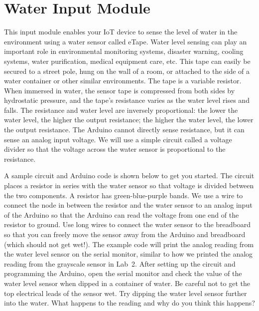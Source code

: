 
\clearpage
\section{Water Input Module}
\label{sec-input-water}

This input module enables your IoT device to sense the level of water in
the environment using a water sensor called eTape. Water level sensing
can play an important role in environmental monitoring systems, disaster
warning, cooling systems, water purification, medical equipment care,
etc. This tape can easily be secured to a street pole, hung on the wall
of a room, or attached to the side of a water container or other similar
environments. The tape is a variable resistor. When immersed in water,
the sensor tape is compressed from both sides by hydrostatic pressure,
and the tape's resistance varies as the water level rises and falls. The
resistance and water level are inversely proportional: the lower the
water level, the higher the output resistance; the higher the water
level, the lower the output resistance.  The Arduino cannot directly
sense resistance, but it can sense an analog input voltage. We will use
a simple circuit called a voltage divider so that the voltage across the
water sensor is proportional to the resistance.

A sample circuit and Arduino code is shown below to get you started.
The circuit places a  resistor in series with the
water sensor so that voltage is divided between the two components. A
 resistor has green-blue-purple bands. We use a wire
to connect the node in between the resistor and the water sensor to an
analog input of the Arduino so that the Arduino can read the voltage
from one end of the  resistor to ground. Use long
wires to connect the water sensor to the breadboard so that you can
freely move the sensor away from the Arduino and breadboard (which
should not get wet!). The example code will print the analog reading
from the water level sensor on the serial monitor, similar to how we
printed the analog reading from the grayscale sensor in Lab~2. After
setting up the circuit and programming the Arduino, open the serial
monitor and check the value of the water level sensor when dipped in a
container of water. Be careful not to get the top electrical leads of
the sensor wet. Try dipping the water level sensor further into the
water. What happens to the reading and why do you think this happens?

